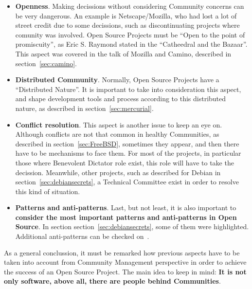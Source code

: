 \documentclass[11pt]{article}
\begin{document}
\begin{itemize}
\begin{itemize}
\item{\textbf{Openness}}. Making decissions without considering Community concerns can be very dangerous. An example is Netscape/Mozilla, who had lost a lot of street credit due to some decissions, such as discontinuating projects where comunity was involved. Open Source Projects must be ``Open to the point of promiscuity'', as Eric S. Raymond stated in the ``Catheedral and the Bazaar''. This aspect was covered in the talk of Mozilla and Camino, described in section~\ref{sec:camino}.
\item{\textbf{Distributed Community}}. Normally, Open Source Projects have a ``Distributed Nature''. It is important to take into consideration this aspect, and shape development tools and process according to this distributed nature, as described in section~\ref{sec:mercurial}.
\item{\textbf{Conflict resolution}}. This aspect is another issue to keep an eye on. Although conflicts are not that common in healthy Communities, as described in section~\ref{sec:FreeBSD}, sometimes they appear, and then there have to be mechanisms to face them. For most of the projects, in particular those where Benevolent Dictator role exist, this role will have to take the decission. Meanwhile, other projects, such as described for Debian in section~\ref{sec:debiansecrets}, a Technical Committee exist in order to resolve this kind of situation.
\item{\textbf{Patterns and anti-patterns}}. Last, but not least, it is also important to \textbf{consider the most important patterns and anti-patterns in Open Source}. In section section~\ref{sec:debiansecrets}, some of them were highlighted. Additional anti-patterns can be checked on~\cite{ANTI00}.
\end{itemize}
\end{itemize}
As a general conclussion, it must be remarked how previous aspects have to be taken into account from Community Management perspective in order to achieve the success of an Open Source Project. The main idea to keep in mind: \textbf{It is not only software, above all, there are people behind Communities}.

\pagebreak


{}
\end{document}
